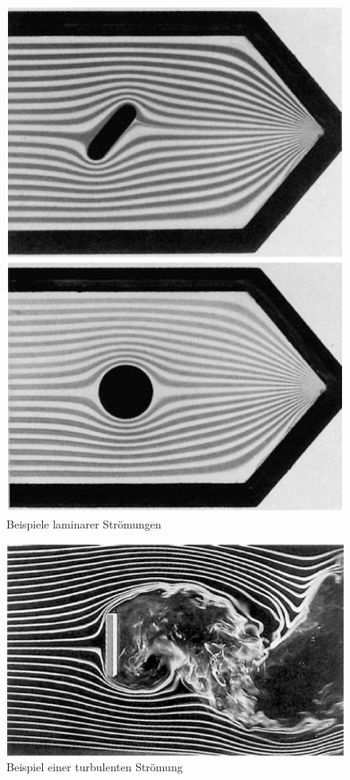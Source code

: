 \begin{figure}
		\centering
        \includegraphics[width=.9\textwidth]{images/8-5}
\caption{Beispiele laminarer Strömungen}
\label{fig:8-5}
\end{figure}

\begin{figure}
	\centering
        \includegraphics[width=.9\textwidth]{images/8-6}
\caption{Beispiel einer turbulenten Strömung}
\label{fig:8-6}
\end{figure}

